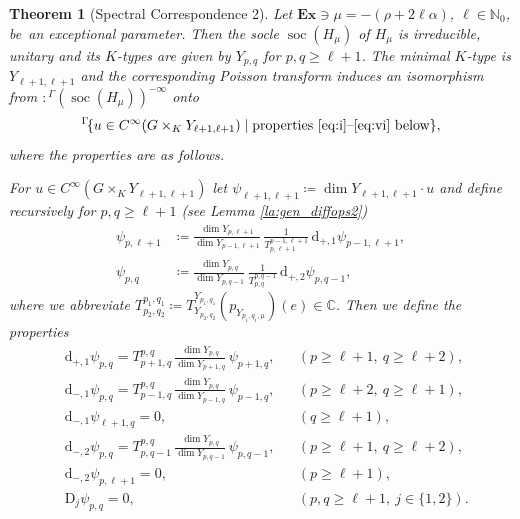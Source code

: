 \documentclass[JEP,XML,SOM,NoFloatCountersInSection,Unicode,published]{cedram}
\newcommand{\Ga}{{}^\Gamma\!}
\newtheorem{theorem}{Theorem}[section]
\theoremstyle{definition}
\newcommand{\on}[1]{\ensuremath{\operatorname{#1}}}
\newcommand{\rhoa}{\ensuremath{\rho}}
\newcommand{\N}{\ensuremath{\mathbb{N}}}
\newcommand{\C}{\ensuremath{\mathbb{C}}}
\newcommand{\pst}[1]{\ensuremath{H_{#1}}}
\begin{document}
\begin{theorem}[Spectral Correspondence 2]\label{thm:spectral_corres_SUn2}
Let $\mathbf{Ex}\ni\mu=-(\rhoa+2\ell\alpha)$, $\ell\in\N_0$, be~an exceptional parameter. Then the socle $\on{soc}(\pst{\mu})$ of $\pst{\mu}$ is irreducible, unitary and its $K$-types are given by $Y_{p,q}$ for $p,q\geq\ell+1$. The minimal $K$-type is $Y_{\ell+1,\ell+1}$ and the corresponding Poisson transform induces an isomorphism from $\colon\Ga(\on{soc}(\pst{\mu}))^{-\infty}$ onto\vspace*{-3pt}
\[
\Ga\{u\in C^\infty(G\times_KY_{\ell+1,\ell+1})\mid \text{properties \eqref{eq:i}--\eqref{eq:vi} below}\},
\]
where the properties are as follows.

For $u\in C^\infty(G\times_KY_{\ell+1,\ell+1})$ let $\psi_{\ell+1,\ell+1}\coloneqq\dim Y_{\ell+1,\ell+1}\cdot u$ and define recursively for $p,q\geq\ell+1$ (see Lemma \ref{la:gen_diffops2})\vspace*{-3pt}
\begin{align*}
\psi_{p,\ell+1}&\coloneqq\frac{\dim Y_{p,\ell+1}}{\dim Y_{p-1,\ell+1}}\,\frac{1}{T^{p-1,\ell+1}_{p,\ell+1}}\,\mathrm{d}_{+,1}\psi_{p-1,\ell+1},\\[-2pt]
\psi_{p,q}&\coloneqq\frac{\dim Y_{p,q}}{\dim Y_{p,q-1}}\,\frac{1}{T^{p,q-1}_{p,q}}\,\mathrm{d}_{+,2}\psi_{p,q-1},
\end{align*}
where we abbreviate $T^{p_1,q_1}_{p_2,q_2}\coloneqq T_{Y_{p_2,q_2}}^{Y_{p_1,q_1}}(p_{Y_{p_1,q_1,\mu}})(e)\in\C$. Then we define the properties\vspace*{-3pt}
\begin{align}
\tag{i}\label{eq:i}&\mathrm{d}_{+,1}\psi_{p,q}=T_{p+1,q}^{p,q}\,\frac{\dim Y_{p,q}}{\dim Y_{p+1,q}}\,\psi_{p+1,q},&& (p\geq\ell+1,\ q\geq\ell+2),\\
\tag{ii}\label{eq:ii}&\mathrm{d}_{-,1}\psi_{p,q}=T_{p-1,q}^{p,q}\,\frac{\dim Y_{p,q}}{\dim Y_{p-1,q}}\,\psi_{p-1,q},&& (p\geq\ell+2,\ q\geq\ell+1),\\[-3pt]
\tag{iii}\label{eq:iii}&\mathrm{d}_{-,1}\psi_{\ell+1,q}=0,&& (q\geq\ell+1),\\[-3pt]
\tag{iv}\label{eq:iv}&\mathrm{d}_{-,2}\psi_{p,q}=T_{p,q-1}^{p,q}\,\frac{\dim Y_{p,q}}{\dim Y_{p,q-1}}\,\psi_{p,q-1},&& (p\geq\ell+1,\ q\geq\ell+2),\\[-3pt]
\tag{v}\label{eq:v}&\mathrm{d}_{-,2}\psi_{p,\ell+1}=0,&& (p\geq\ell+1),\\
\tag{vi}\label{eq:vi}&\mathrm{D}_j\psi_{p,q}=0,&& (p,q\geq\ell+1,\ j\in\{1,2\}).
\end{align}
\end{theorem}
\end{document}
